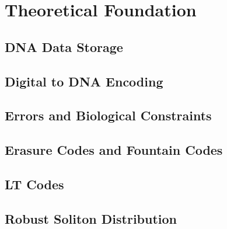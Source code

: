 \chapter{Theoretical Foundation}
\label{chap:theoretical_foundation}

\section{DNA Data Storage}
\label{sec:dna_data_storage}

\section{Digital to DNA Encoding}
\label{sec:digital_to_dna_encoding}

\section{Errors and Biological Constraints}
\label{sec:errors_and_biological_constraints}

\section{Erasure Codes and Fountain Codes}
\label{sec:erasure_codes_and_fountain_codes}

\section{LT Codes}
\label{sec:lt_codes}

\section{Robust Soliton Distribution}
\label{sec:robust_soliton_distribution}


